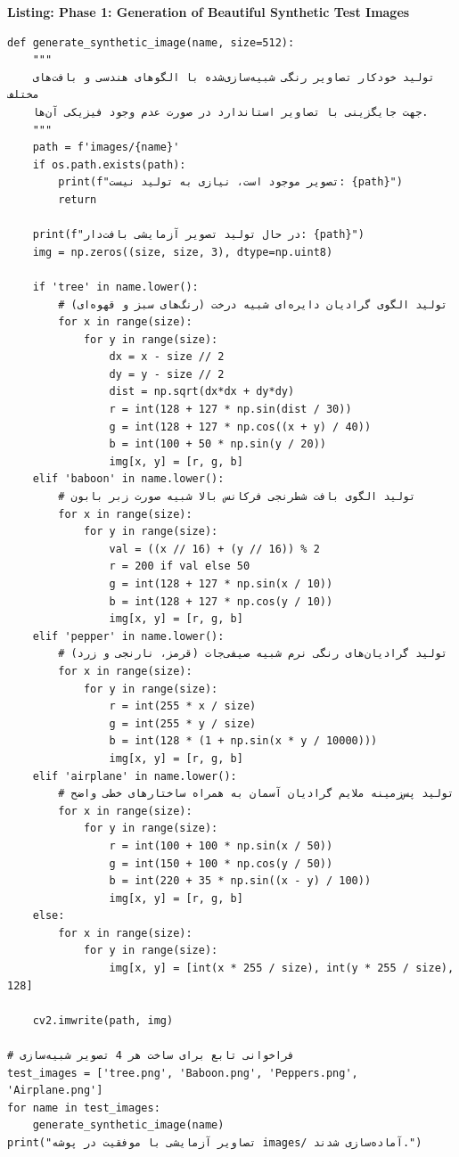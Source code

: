 \begin{latin}
\noindent\textbf{Listing: Phase 1: Generation of Beautiful Synthetic Test Images}
\begin{verbatim}
def generate_synthetic_image(name, size=512):
    """
    تولید خودکار تصاویر رنگی شبیه‌سازی‌شده با الگوهای هندسی و بافت‌های مختلف
    جهت جایگزینی با تصاویر استاندارد در صورت عدم وجود فیزیکی آن‌ها.
    """
    path = f'images/{name}'
    if os.path.exists(path):
        print(f"تصویر موجود است، نیازی به تولید نیست: {path}")
        return
    
    print(f"در حال تولید تصویر آزمایشی بافت‌دار: {path}")
    img = np.zeros((size, size, 3), dtype=np.uint8)
    
    if 'tree' in name.lower():
        # تولید الگوی گرادیان دایره‌ای شبیه درخت (رنگ‌های سبز و قهوه‌ای)
        for x in range(size):
            for y in range(size):
                dx = x - size // 2
                dy = y - size // 2
                dist = np.sqrt(dx*dx + dy*dy)
                r = int(128 + 127 * np.sin(dist / 30))
                g = int(128 + 127 * np.cos((x + y) / 40))
                b = int(100 + 50 * np.sin(y / 20))
                img[x, y] = [r, g, b]
    elif 'baboon' in name.lower():
        # تولید الگوی بافت شطرنجی فرکانس بالا شبیه صورت زبر بابون
        for x in range(size):
            for y in range(size):
                val = ((x // 16) + (y // 16)) % 2
                r = 200 if val else 50
                g = int(128 + 127 * np.sin(x / 10))
                b = int(128 + 127 * np.cos(y / 10))
                img[x, y] = [r, g, b]
    elif 'pepper' in name.lower():
        # تولید گرادیان‌های رنگی نرم شبیه صیفی‌جات (قرمز، نارنجی و زرد)
        for x in range(size):
            for y in range(size):
                r = int(255 * x / size)
                g = int(255 * y / size)
                b = int(128 * (1 + np.sin(x * y / 10000)))
                img[x, y] = [r, g, b]
    elif 'airplane' in name.lower():
        # تولید پس‌زمینه ملایم گرادیان آسمان به همراه ساختارهای خطی واضح
        for x in range(size):
            for y in range(size):
                r = int(100 + 100 * np.sin(x / 50))
                g = int(150 + 100 * np.cos(y / 50))
                b = int(220 + 35 * np.sin((x - y) / 100))
                img[x, y] = [r, g, b]
    else:
        for x in range(size):
            for y in range(size):
                img[x, y] = [int(x * 255 / size), int(y * 255 / size), 128]
                
    cv2.imwrite(path, img)

# فراخوانی تابع برای ساخت هر 4 تصویر شبیه‌سازی
test_images = ['tree.png', 'Baboon.png', 'Peppers.png', 'Airplane.png']
for name in test_images:
    generate_synthetic_image(name)
print("تصاویر آزمایشی با موفقیت در پوشه images/ آماده‌سازی شدند.")
\end{verbatim}
\end{latin}

